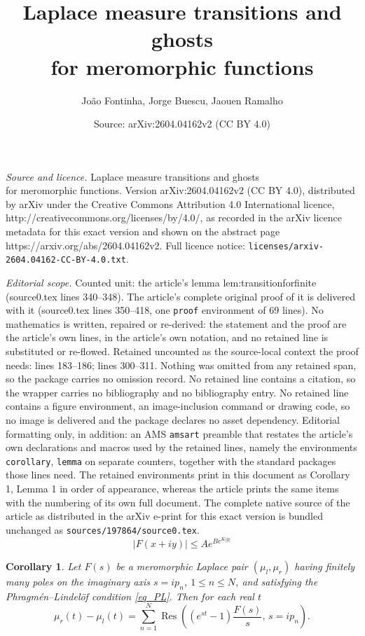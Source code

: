 \documentclass[10pt,a4paper]{amsart}
\title{Laplace measure transitions and ghosts\\ for meromorphic functions}
\author{Jo\~ao Fontinha, Jorge Buescu, Jaouen Ramalho}
\date{Source: arXiv:2604.04162v2 (CC BY 4.0)}
\newtheorem{corollary}{Corollary}
\DeclareMathOperator*{\Res}{Res}
\begin{document}
\maketitle

\noindent\emph{Source and licence.} Laplace measure transitions and ghosts\\ for meromorphic functions. Version arXiv:2604.04162v2 (CC BY 4.0), distributed by arXiv under the Creative Commons Attribution 4.0 International licence, http://creativecommons.org/licenses/by/4.0/, as recorded in the arXiv licence metadata for this exact version and shown on the abstract page https://arxiv.org/abs/2604.04162v2. Full licence notice: \texttt{licenses/arxiv-2604.04162-CC-BY-4.0.txt}.\par\smallskip

\noindent\textit{Editorial scope.} Counted unit: the article's lemma lem:transitionforfinite (source0.tex lines 340--348). The article's complete original proof of it is delivered with it (source0.tex lines 350--418, one \texttt{proof} environment of 69 lines). No mathematics is written, repaired or re-derived: the statement and the proof are the article's own lines, in the article's own notation, and no retained line is substituted or re-flowed.  Retained uncounted as the source-local context the proof needs: lines 183--186; lines 300--311.  Nothing was omitted from any retained span, so the package carries no omission record.  No retained line contains a citation, so the wrapper carries no bibliography and no bibliography entry.  No retained line contains a figure environment, an image-inclusion command or drawing code, so no image is delivered and the package declares no asset dependency.  Editorial formatting only, in addition: an AMS \texttt{amsart} preamble that restates the article's own declarations and macros used by the retained lines, namely the environments \texttt{corollary}, \texttt{lemma} on separate counters, together with the standard packages those lines need.  The retained environments print in this document as Corollary 1, Lemma 1 in order of appearance, whereas the article prints the same items with the numbering of its own full document.  The complete native source of the article as distributed in the arXiv e-print for this exact version is bundled unchanged as \texttt{sources/197864/source0.tex}.
     \begin{equation}
     \label{eq_PL}
         |F(x+iy)| \leq Ae^{Be^{K|y|}} 
     \end{equation}

\begin{corollary}\label{cor:finitepoles}
Let \( F(s) \) be a meromorphic Laplace pair \( (\mu_l,\mu_r) \) having finitely many poles  on the imaginary axis 
\( s=ip_n \), \( 1\le n\le N \), and satisfying the Phragmén--Lindelöf condition \eqref{eq_PL}. Then for each real \( t \)
\begin{equation}
    \label{eq:finite_transition_formula}
\mu_r(t)-\mu_l(t) 
=
\sum_{n=1}^{N}
\Res\!\left((e^{st}-1)\frac{F(s)}{s},\, s=ip_n\right).
\end{equation}

\end{corollary}
\end{document}
